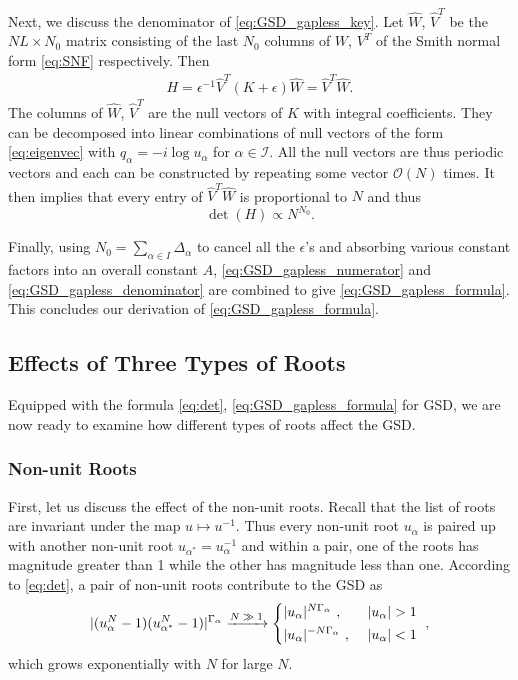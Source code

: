 \documentclass[aps,prb,twocolumn,superscriptaddress,floatfix,10pt,nofootinbib]{revtex4-2}
\newcommand{\ie}{\begin{equation}\begin{aligned}}
\newcommand{\fe}{\end{aligned}\end{equation}}
\theoremstyle{definition}
\begin{document}
Next, we discuss the denominator of \eqref{eq:GSD_gapless_key}. Let $\hat W$, $\hat V^T$ be the $NL\times N_0$ matrix consisting of the last $N_0$ columns of $W$, $V^T$ of the Smith normal form \eqref{eq:SNF} respectively. Then
\ie
H=\epsilon^{-1}\hat V^T(K+\epsilon)\hat W=\hat V^T \hat W.
\fe
The columns of $\hat W$, $\hat V^T$ are the null vectors of $K$ with integral coefficients. They can be decomposed into linear combinations of null vectors of the form \eqref{eq:eigenvec} with $q_\alpha=-i\log u_\alpha$ for $\alpha\in\mathcal{I}$. All the null vectors are thus periodic vectors and each can be constructed by repeating some vector $\mathcal{O}(N)$ times.
It then implies that every entry of $\hat V^T\hat W$ is proportional to $N$ and thus
\begin{equation}\label{eq:GSD_gapless_denominator}
    \det(H)\propto N^{N_0}.
\end{equation}

Finally, using $N_0=\sum_{\alpha\in I}\Delta_\alpha$ to cancel all the $\epsilon$'s and absorbing various constant factors into an overall constant $A$, \eqref{eq:GSD_gapless_numerator} and \eqref{eq:GSD_gapless_denominator} are combined to give \eqref{eq:GSD_gapless_formula}. This concludes our derivation of \eqref{eq:GSD_gapless_formula}.

\subsection{Effects of Three Types of Roots}

Equipped with the formula \eqref{eq:det}, \eqref{eq:GSD_gapless_formula} for GSD, we are now ready to examine how different types of roots affect the GSD. 

\subsubsection{Non-unit Roots}

First, let us discuss the effect of the non-unit roots. Recall that the list of roots are invariant under the map $u\mapsto u^{-1}$. Thus every non-unit root $u_\alpha$ is paired up with another non-unit root $u_{\alpha^*}=u_\alpha^{-1}$ and within a pair, one of the roots has magnitude greater than 1 while the other has magnitude less than one. According to \eqref{eq:det}, a pair of non-unit roots contribute to the GSD as
\ie
|(u_\alpha^N-1)(u_{\alpha^*}^{N}-1)|^{\Gamma_\alpha}\xrightarrow[]{\text{$N\gg1$}}
\begin{dcases}
    |u_\alpha|^{N\Gamma_\alpha}~, \ &|u_\alpha|>1
    \\
    |u_\alpha|^{-N\Gamma_\alpha}~,\ &|u_\alpha|<1
\end{dcases}~,
\fe
which grows exponentially with $N$ for large $N$.
\end{document}
